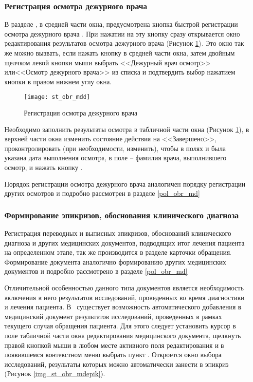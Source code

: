 \subsubsection{Регистрация осмотра дежурного врача}
 
В разделе , в средней части окна, предусмотрена кнопка быстрой регистрации осмотра дежурного врача . При нажатии на эту кнопку сразу открывается окно редактирования результатов осмотра дежурного врача (Рисунок \ref{img_st_obr_mdd}). Это окно так же можно вызвать, если нажать кнопку   в средней части окна, затем двойным щелчком левой кнопки мыши выбрать <<Дежурный врач осмотр>> или<<Осмотр дежурного врача>> из списка и подтвердить выбор нажатием кнопки  в правом нижнем углу окна. 

\begin{figure}[ht]\centering
   \texttt{[image: st\_obr\_mdd]}
   \caption{Регистрация осмотра дежурного врача}
   \label{img_st_obr_mdd}
\end{figure} 

Необходимо заполнить результаты осмотра в табличной части окна (Рисунок \ref{img_st_obr_mdd}), в верхней части окна изменить состояние действия на <<Завершено>>, проконтролировать (при необходимости, изменить), чтобы в полях  и  была указана дата выполнения осмотра, в поле  – фамилия врача, выполнившего осмотр, и нажать кнопку .

Порядок регистрации осмотра дежурного врача аналогичен порядку регистрации других осмотров и подробно рассмотрен в разделе \ref{pol_obr_md}

\subsubsection{Формирование эпикризов, обоснования клинического диагноза}

Регистрация переводных и выписных эпикризов, обоснований клинического диагноза и других медицинских документов, подводящих итог лечения пациента на определенном этапе, так же производится в разделе  карточки обращения. Формирование документа аналогично формированию других медицинских документов и подробно рассмотрено в разделе \ref{pol_obr_md}

Отличительной особенностью данного типа документов является необходимость включения в него результатов исследований, проведенных во время диагностики и лечения пациента. В \tmis~существует возможность автоматического добавления в медицинский документ результатов исследований, проведенных в рамках текущего случая обращения пациента. Для этого следует установить курсор в поле  табличной части окна редактирования медицинского документа, щелкнуть правой кнопкой мыши в любом месте активного поля редактирования и в появившемся контекстном меню выбрать пункт . Откроется окно выбора исследований, результаты которых можно автоматически занести в эпикриз (Рисунок \ref{img_st_obr_mdepik}).

